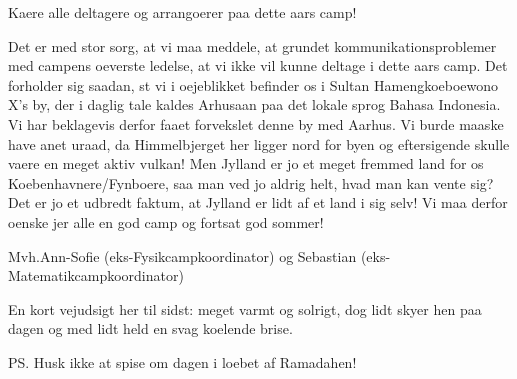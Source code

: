 \begin{minipage}[b]{0.95\linewidth}
\begin{minipage}[t]{0.47\textwidth}
Kaere alle deltagere og arrangoerer paa dette aars camp!

Det er med stor sorg, at vi maa meddele, at grundet kommunikationsproblemer med campens oeverste ledelse, at vi ikke vil kunne deltage i dette aars camp. 
Det forholder sig saadan, st vi i oejeblikket befinder os i Sultan Hamengkoeboewono X's by, der i daglig tale kaldes Arhusaan paa det lokale sprog Bahasa Indonesia. 
Vi har beklagevis derfor faaet forvekslet denne by med Aarhus. Vi burde maaske have anet uraad, da Himmelbjerget her ligger nord for byen og eftersigende skulle vaere en meget aktiv vulkan! Men Jylland er jo et meget fremmed land for os Koebenhavnere/Fynboere, saa man ved jo aldrig helt, hvad man kan vente sig? Det er jo et udbredt faktum, at Jylland er lidt af et land i sig selv!
Vi maa derfor oenske jer alle en god camp og fortsat god sommer!

Mvh.Ann-Sofie (eks-Fysikcampkoordinator) og Sebastian (eks-Matematikcampkoordinator)

En kort vejudsigt her til sidst: meget varmt og solrigt, dog lidt skyer hen paa dagen og med lidt held en svag koelende brise.

PS. Husk ikke at spise om dagen i loebet af Ramadahen!


\end{minipage}
\end{minipage}
